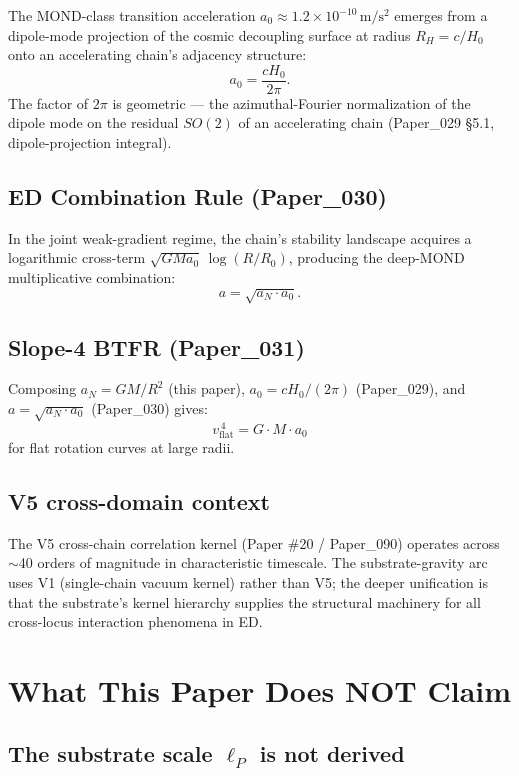 \documentclass[11pt,a4paper]{article}
\begin{document}
The MOND-class transition acceleration $a_0 \approx 1.2 \times 10^{-10}\,\mathrm{m/s^2}$ emerges from a dipole-mode projection of the cosmic decoupling surface at radius $R_H = c/H_0$ onto an accelerating chain's adjacency structure:
\[
a_0 = \frac{cH_0}{2\pi}.
\]
The factor of $2\pi$ is geometric --- the azimuthal-Fourier normalization of the dipole mode on the residual $SO(2)$ of an accelerating chain (Paper\_029 \S5.1, dipole-projection integral).

\subsection{ED Combination Rule (Paper\_030)}

In the joint weak-gradient regime, the chain's stability landscape acquires a logarithmic cross-term $\sqrt{GMa_0}\,\log(R/R_0)$, producing the deep-MOND multiplicative combination:
\[
a = \sqrt{a_N \cdot a_0}.
\]

\subsection{Slope-4 BTFR (Paper\_031)}

Composing $a_N = GM/R^2$ (this paper), $a_0 = cH_0/(2\pi)$ (Paper\_029), and $a = \sqrt{a_N \cdot a_0}$ (Paper\_030) gives:
\[
v_\mathrm{flat}^{\,4} = G \cdot M \cdot a_0
\]
for flat rotation curves at large radii.

\subsection{V5 cross-domain context}

The V5 cross-chain correlation kernel (Paper \#20 / Paper\_090) operates across $\sim$40 orders of magnitude in characteristic timescale. The substrate-gravity arc uses V1 (single-chain vacuum kernel) rather than V5; the deeper unification is that the substrate's kernel hierarchy supplies the structural machinery for all cross-locus interaction phenomena in ED.

\section{What This Paper Does NOT Claim}

\subsection{The substrate scale $\ell_P$ is not derived}
\end{document}
